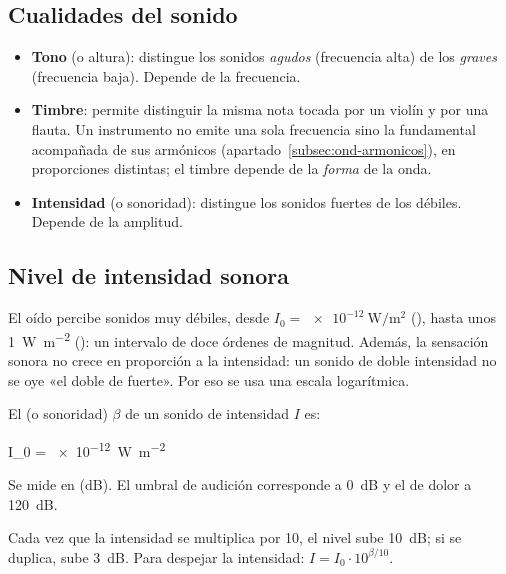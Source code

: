 \subsection{Cualidades del sonido}\label{subsec:ond-cualidades}

\begin{itemize}
    \item \textbf{Tono} (o altura): distingue los sonidos \emph{agudos} (frecuencia alta) de los \emph{graves} (frecuencia
    baja). Depende de la frecuencia.
    \item \textbf{Timbre}: permite distinguir la misma nota tocada por un violín y por una flauta. Un instrumento no emite
    una sola frecuencia sino la fundamental acompañada de sus armónicos (apartado~\ref{subsec:ond-armonicos}), en
    proporciones distintas; el timbre depende de la \emph{forma} de la onda.
    \item \textbf{Intensidad} (o sonoridad): distingue los sonidos fuertes de los débiles. Depende de la amplitud.
\end{itemize}

\subsection{Nivel de intensidad sonora}\label{subsec:ond-decibelios}

El oído percibe sonidos muy débiles, desde \(I_0 = \qty{e-12}{\watt\per\square\m}\) (), hasta
unos \qty{1}{\watt\per\square\m} (): un intervalo de doce órdenes de magnitud. Además, la sensación
sonora no crece en proporción a la intensidad: un sonido de doble intensidad no se oye «el doble de fuerte». Por eso se usa
una escala logarítmica.

\begin{definition}
    El  (o sonoridad) \(\beta\) de un sonido de intensidad \(I\) es:
    \begin{centeredequation}
         \qquad I_0 = \qty{e-12}{\watt\per\square\m} \label{eq:ond-decibelios}
    \end{centeredequation}
    Se mide en  (\unit{\deci\bel}). El umbral de audición corresponde a \qty{0}{\deci\bel} y el de dolor a
    \qty{120}{\deci\bel}.
\end{definition}

\begin{remark}
    Cada vez que la intensidad se multiplica por 10, el nivel sube \qty{10}{\deci\bel}; si se duplica, sube \qty{3}{\deci\bel}.
    Para despejar la intensidad: \(I = I_0\cdot 10^{\beta/10}\).
\end{remark}

